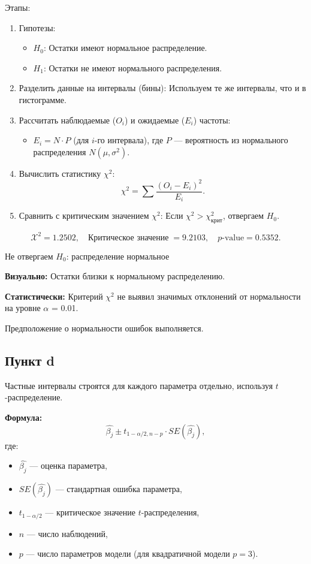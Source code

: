 \documentclass[12pt]{spbstu-task}
\begin{document}
Этапы:
\begin{enumerate}
\item Гипотезы:
\begin{itemize}
\item \(H_0\): Остатки имеют нормальное распределение.
\item \(H_1\): Остатки не имеют нормального распределения.
\end{itemize}
\item Разделить данные на интервалы (бины): Используем те же интервалы,
что и в гистограмме.
\item Рассчитать наблюдаемые (\(O_i\)) и ожидаемые (\(E_i\)) частоты:
\begin{itemize}
\item \(E_i = N \cdot P\) (для \(i\)-го интервала), где \(P\) ---
вероятность из нормального распределения \(N(\mu, \sigma^2)\).
\end{itemize}
\item Вычислить статистику \(\chi^2\): \[\chi^2 = \sum \frac{(O_i -
   E_i)^2}{E_i}.\]
\item Сравнить с критическим значением \(\chi^2\): Если \(\chi^2 >
   \chi^2_{\text{крит}}\), отвергаем \(H_0\).
\end{enumerate}

\begin{displaymath}
  \mathcal{X}^2 = 1.2502,\quad
  \text{Критическое значение}\; = 9.2103,\quad
  p\text{-value} = 0.5352.
\end{displaymath}

Не отвергаем \(H_0\): распределение нормальное

\textbf{Визуально:} Остатки близки к нормальному распределению.

\textbf{Статистически:} Критерий \(\chi^2\) не выявил значимых отклонений от
нормальности на уровне \(\alpha\) = 
0.01.

Предположение о нормальности ошибок выполняется.
\subsection{Пункт d}
\label{sec:orga54edb4}
Частные интервалы строятся для каждого параметра отдельно, используя
\(t\)-распределение.

\textbf{Формула:} \[\hat{\beta_j} \pm t_{1-\alpha/2, n-p} \cdot
SE(\hat{\beta_j}),\] где:
\begin{itemize}
\item \(\hat{\beta_j}\) --- оценка параметра,
\item \(SE(\hat{\beta_j})\) --- стандартная ошибка параметра,
\item \(t_{1-\alpha/2}\) --- критическое значение \(t\)-распределения,
\item \(n\) --- число наблюдений,
\item \(p\) --- число параметров модели (для квадратичной модели \(p =
  3\)).
\end{itemize}
\end{document}
